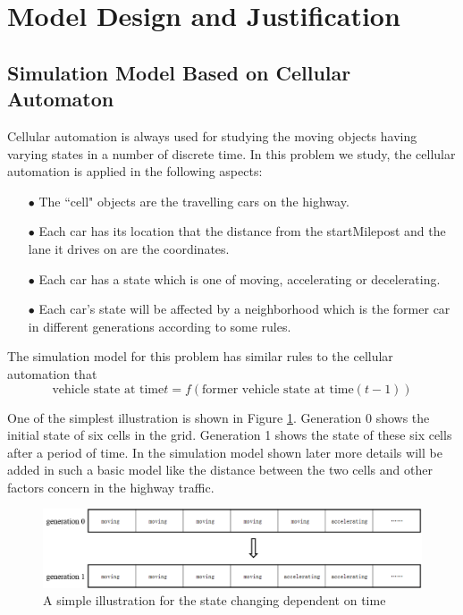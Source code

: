 \documentclass[a4paper]{article}
\begin{document}
	\section{Model Design and Justification}
	\subsection{Simulation Model Based on Cellular Automaton}
	Cellular automation is always used for studying the moving objects having varying states in a number of discrete time. In this problem we study, the cellular automation is applied in the following aspects:
	\begin{enumerate}
		\item[$ \bullet $] The ``cell" objects are the travelling cars on the highway.
		\item[$ \bullet $] Each car has its location that the distance from the startMilepost and the lane it drives on are the coordinates.
		\item[$ \bullet $] Each car has a state which is one of moving, accelerating or decelerating.
		\item[$ \bullet $] Each car's state will be affected by a neighborhood which is the former car in different generations according to some rules. 
	\end{enumerate} 
	
	The simulation model for this problem has similar rules to the cellular automation that 
	$$ \text{vehicle state at time} t=f(\text{former vehicle state at time} (t-1)) $$
	
	One of the simplest illustration is shown in Figure \ref{generation}. Generation 0 shows the initial state of six cells in the grid. Generation 1 shows the state of these six cells after a period of time. In the simulation model shown later more details will be added in such a basic model like the distance between the two cells and other factors concern in the highway traffic. 
	
	\begin{figure}[H]
		\centering
		\includegraphics[scale=0.6]{generation}
		\caption{A simple illustration for the state changing dependent on time}
		\label{generation}
	\end{figure}
	
\end{document}
